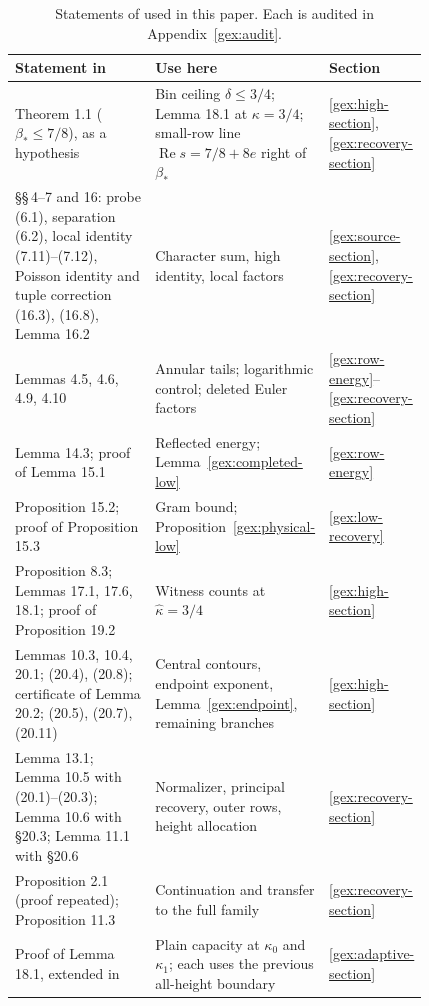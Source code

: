 \documentclass[11pt]{article}
\theoremstyle{definition}
\newcommand{\Rea}{\operatorname{Re}}
\begin{document}
\begin{table}[htbp]
\centering
\small
\caption{Statements of \cite{OAI26} used in this paper. Each is
audited in Appendix~\ref{gex:audit}.}
\label{gex:input-table}
\begin{tabular}{@{}>{\raggedright\arraybackslash}p{0.42\linewidth}
                >{\raggedright\arraybackslash}p{0.40\linewidth}l@{}}
\toprule
Statement in \cite{OAI26} & Use here & Section\\
\midrule
Theorem 1.1 ($\beta_*\le7/8$), as a hypothesis
 & Bin ceiling $\delta\le3/4$; Lemma 18.1 at $\kappa=3/4$;
   small-row line $\Rea s=7/8+8e$ right of $\beta_*$
 & \ref{gex:high-section}, \ref{gex:recovery-section}\\
\addlinespace[2pt]
\S\S\,4--7 and 16: probe (6.1), separation (6.2), local identity
(7.11)--(7.12), Poisson identity and tuple correction (16.3), (16.8),
Lemma 16.2
 & Character sum, high identity, local factors
 & \ref{gex:source-section}, \ref{gex:recovery-section}\\
\addlinespace[2pt]
Lemmas 4.5, 4.6, 4.9, 4.10
 & Annular tails; logarithmic control; deleted Euler factors
 & \ref{gex:row-energy}--\ref{gex:recovery-section}\\
\addlinespace[2pt]
Lemma 14.3; proof of Lemma 15.1
 & Reflected energy; Lemma~\ref{gex:completed-low}
 & \ref{gex:row-energy}\\
\addlinespace[2pt]
Proposition 15.2; proof of Proposition 15.3
 & Gram bound; Proposition~\ref{gex:physical-low}
 & \ref{gex:low-recovery}\\
\addlinespace[2pt]
Proposition 8.3; Lemmas 17.1, 17.6, 18.1; proof of Proposition 19.2
 & Witness counts at $\widehat\kappa=3/4$
 & \ref{gex:high-section}\\
\addlinespace[2pt]
Lemmas 10.3, 10.4, 20.1; (20.4), (20.8); certificate of Lemma 20.2;
(20.5), (20.7), (20.11)
 & Central contours, endpoint exponent, Lemma~\ref{gex:endpoint},
   remaining branches
 & \ref{gex:high-section}\\
\addlinespace[2pt]
Lemma 13.1; Lemma 10.5 with (20.1)--(20.3); Lemma 10.6 with \S20.3;
Lemma 11.1 with \S20.6
 & Normalizer, principal recovery, outer rows, height allocation
 & \ref{gex:recovery-section}\\
\addlinespace[2pt]
Proposition 2.1 (proof repeated); Proposition 11.3
 & Continuation and transfer to the full family
 & \ref{gex:recovery-section}\\
\addlinespace[2pt]
Proof of Lemma 18.1, extended in \cite{GaoAdaptive26}
 & Plain capacity at $\kappa_0$ and $\kappa_1$; each uses the previous
   all-height boundary
 & \ref{gex:adaptive-section}\\
\bottomrule
\end{tabular}
\end{table}
\end{document}
